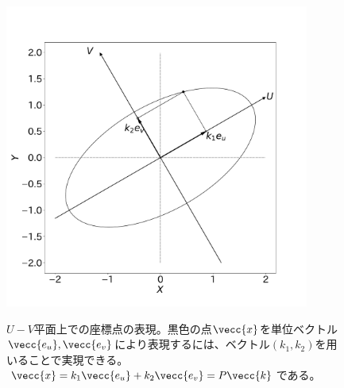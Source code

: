 \begin{figure}
 \begin{center}
  \includegraphics[width=10cm]{./image/16_/ellipse_U_V_plane.pdf}
  \label{fig:ellipse_U_V_plane}
  \caption{$U-V$平面上での座標点の表現。黒色の点$\vecc{x}$を単位ベクトル$\vecc{e_u},\vecc{e_v}$により表現するには、ベクトル$(k_1,k_2)$を用いることで実現できる。$\vecc{x}=k_1\vecc{e_u}+k_2\vecc{e_v}=P\vecc{k}$である。}
 \end{center}
\end{figure}

